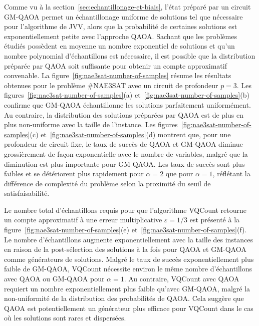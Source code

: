 Comme vu à la section~\ref{sec:echantillonage-et-biais}, l'état préparé par un circuit GM-QAOA permet un échantillonage uniforme de solutions tel que nécessaire pour l'algorithme de JVV, alors que la probabilité de certaines solutions est exponentiellement petite avec l'approche QAOA. Sachant que les problèmes étudiés possèdent en moyenne un nombre exponentiel de solutions et qu'un nombre polynomial d'échantillons est nécessaire, il est possible que la distribution préparée par QAOA soit suffisante pour obtenir un compte approximatif convenable. La figure~\ref{fig:nae3sat-number-of-samples} résume les résultats obtenues pour le problème \#NAE3SAT avec un circuit de profondeur $p=3$. Les figures~\ref{fig:nae3sat-number-of-samples}(a) et~\ref{fig:nae3sat-number-of-samples}(b) confirme que GM-QAOA échantillonne les solutions parfaitement uniformément. Au contraire, la distribution des solutions préparées par QAOA est de plus en plus non-uniforme avec la taille de l'instance. Les figures~\ref{fig:nae3sat-number-of-samples}(c) et~\ref{fig:nae3sat-number-of-samples}(d) montrent que, pour une profondeur de circuit fixe, le taux de succès de QAOA et GM-QAOA diminue grossièrement de façon exponentielle avec le nombre de variables, malgré que la diminution est plus importante pour GM-QAOA. Les taux de succès sont plus faibles et se détériorent plus rapidement pour $\alpha = 2$ que pour $\alpha=1$, réflétant la différence de complexité du problème selon la proximité du seuil de satisfaisabilité.

Le nombre total d'échantillons requis pour que l'algorithme VQCount retourne un compte approximatif à une erreur multiplicative $\varepsilon = 1/3$ est présenté à la figure~\ref{fig:nae3sat-number-of-samples}(e) et~\ref{fig:nae3sat-number-of-samples}(f). Le nombre d'échantillons augmente exponentiellement avec la taille des instances en raison de la post-sélection des solutions à la fois pour QAOA et GM-QAOA comme générateurs de solutions. Malgré le taux de succès exponentiellement plus faible de GM-QAOA, VQCount nécessite environ le même nombre d'échantillons avec QAOA ou GM-QAOA pour $\alpha=1$. Au contraire, VQCount avec QAOA requiert un nombre exponentiellement plus faible qu'avec GM-QAOA, malgré la non-uniformité de la distribution des probabilités de QAOA. Cela suggère que QAOA est potentiellement un générateur plus efficace pour VQCount dans le cas où les solutions sont rares et dispersées.


